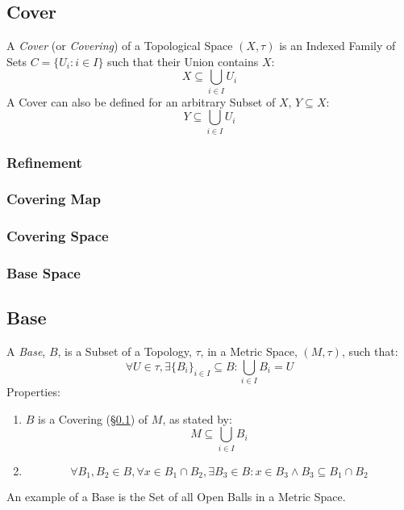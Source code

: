 \subsection{Cover}\label{sec:topological_cover}

A \emph{Cover} (or \emph{Covering}) of a Topological Space $(X, \tau)$
is an Indexed Family of Sets $C = \{ U_i : i \in I \}$ such that their
Union contains $X$:
\[
  X \subseteq \bigcup_{i \in I} U_i
\]
A Cover can also be defined for an arbitrary Subset of $X$, $Y
\subseteq X$:
\[
  Y \subseteq \bigcup_{i \in I} U_i
\]



\subsubsection{Refinement}\label{sec:refinement}

\subsubsection{Covering Map}\label{sec:covering_map}

\subsubsection{Covering Space}\label{sec:covering_space}

\subsubsection{Base Space}\label{sec:base_space}



\subsection{Base}\label{sec:topological_base}

A \emph{Base}, $B$, is a Subset of a Topology, $\tau$, in a Metric
Space, $(M,\tau)$, such that:
\[
  \forall U \in \tau, \exists \{B_i\}_{i \in I} \subseteq B :
  \bigcup_{i \in I}B_i = U
\]
Properties:
\begin{enumerate}
  \item $B$ is a Covering (\S\ref{sec:topological_cover}) of $M$, as
    stated by:
\[
  M \subseteq \bigcup_{i \in I} B_i
\]

  \item
\[
  \forall B_1, B_2 \in B, \forall x \in B_1 \cap B_2,
  \exists B_3 \in B : x \in B_3 \wedge B_3 \subseteq B_1 \cap B_2
\]

\end{enumerate}
An example of a Base is the Set of all Open Balls in a Metric Space.

